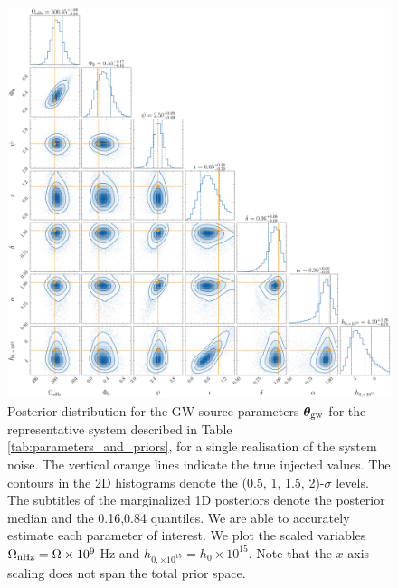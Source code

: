 \documentclass[fleqn,usenatbib,useAMS]{mnras}
\begin{document}
 
\begin{figure}
	\includegraphics[width=\textwidth, height =\textwidth ]{images/small_h_posterior_10}
	\caption{Posterior distribution for the GW source parameters $\boldsymbol{\theta}_{\rm gw}$ for the representative system described in Table \ref{tab:parameters_and_priors}, for a single realisation of the system noise. The vertical orange lines indicate the true injected values. The contours in the 2D histograms denote the (0.5, 1, 1.5, 2)-$\sigma$ levels. The subtitles of the marginalized 1D posteriors denote the posterior median and the 0.16,0.84 quantiles. We are able to accurately estimate each parameter of interest. We plot the scaled variables $\Omega_{\rm nHz} = \Omega \times 10^{9}$ Hz and $h_{0, \times 10^{15}} = h_0 \times 10^{15}$. Note that the $x$-axis scaling does not span the total prior space.}
	\label{fig:corner_plot_1}
\end{figure}

\end{document}
